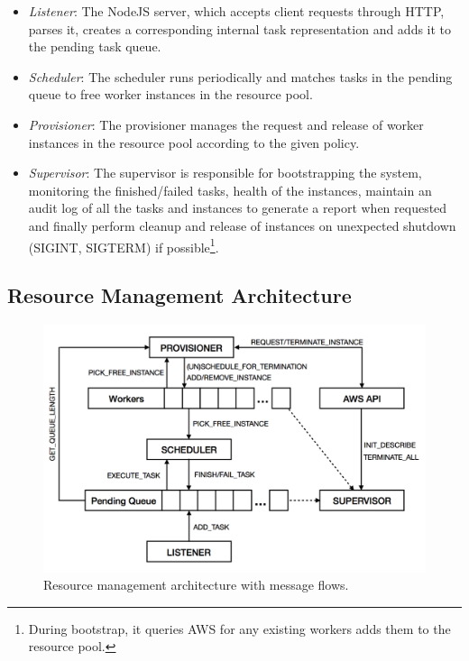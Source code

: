 \documentclass[a4paper]{IEEEtran}
\begin{document}
 \begin{itemize}
   \item \emph{Listener}: The NodeJS server, which accepts client requests through HTTP, parses it, creates a 
   corresponding internal task representation and adds it to the pending task queue.
   \item \emph{Scheduler}: The scheduler runs periodically and matches tasks in the pending queue to free
   worker instances in the resource pool.
   \item \emph{Provisioner}: The provisioner manages the request and release of worker instances in the resource 
   pool according to the given policy.
   \item \emph{Supervisor}: The supervisor is responsible for bootstrapping the system, monitoring the finished/failed tasks, health of the instances, maintain an audit log of all the tasks and instances to generate a report when requested and finally perform cleanup and release of instances on unexpected shutdown (SIGINT, SIGTERM)
   if possible\footnote{During bootstrap, it queries AWS for any existing workers adds them to the resource pool.}.
 \end{itemize}

\subsection{Resource Management Architecture}
 
\begin{figure}[bp]
  \centering
    \includegraphics[width=\columnwidth]{resource-management.png}
  \caption{Resource management architecture with message flows.}
  \label{fig:resource_management}
\end{figure}
\end{document}
